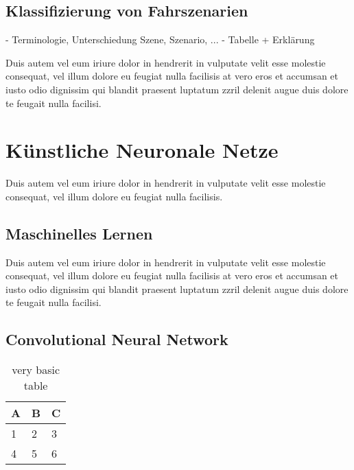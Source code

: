 \subsection{Klassifizierung von Fahrszenarien}
\label{grundlagen_fahren_szenarien}

- Terminologie, Unterschiedung Szene, Szenario, ...
- Tabelle + Erklärung

Duis autem vel eum iriure dolor in hendrerit in vulputate velit esse molestie consequat, vel illum dolore eu feugiat nulla facilisis at vero eros et accumsan et iusto odio dignissim qui blandit praesent luptatum zzril delenit augue duis dolore te feugait nulla facilisi.   


\section{Künstliche Neuronale Netze}
\label{grundlagen_nn}

Duis autem vel eum iriure dolor in hendrerit in vulputate velit esse molestie consequat, vel illum dolore eu feugiat nulla facilisis.


\subsection{Maschinelles Lernen}
\label{grundlagen_nn_ml}

Duis autem vel eum iriure dolor in hendrerit in vulputate velit esse molestie consequat, vel illum dolore eu feugiat nulla facilisis at vero eros et accumsan et iusto odio dignissim qui blandit praesent luptatum zzril delenit augue duis dolore te feugait nulla facilisi. 


\subsection{Convolutional Neural Network}
\label{grundlagen_nn_cnn}


\begin{table}[h]
\centering
\begin{tabular}{l | l | l}
A & B & C \\
\hline
1 & 2 & 3 \\
4 & 5 & 6
\end{tabular}
\caption{very basic table}
\label{tab:abc}
\end{table}


